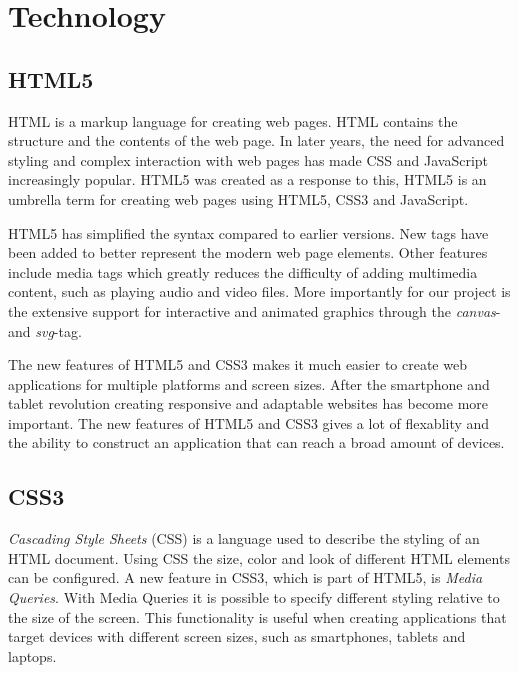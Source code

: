 \chapter{Technology} %

\label{Chapter2} %


\section{HTML5}
HTML is a markup language for creating web pages. HTML contains the structure and the contents of the web page. In later years, the need for advanced styling and complex interaction with web pages has made CSS and JavaScript increasingly popular. HTML5 was created as a response to this, HTML5 is an umbrella term for creating web pages using HTML5, CSS3 and JavaScript.

HTML5 has simplified the syntax compared to earlier versions. New tags have been added to better represent the modern web page elements. Other features include media tags which greatly reduces the difficulty of adding multimedia content, such as playing audio and video files. More importantly for our project is the extensive support for interactive and animated graphics through the \emph{canvas}- and \emph{svg}-tag.

The new features of HTML5 and CSS3 makes it much easier to create web applications for multiple platforms and screen sizes. After the smartphone and tablet revolution creating responsive and adaptable websites has become more important. %
The new features of HTML5 and CSS3 gives a lot of flexablity and the ability to construct an application that can reach a broad amount of devices.


\section{CSS3}
\emph{Cascading Style Sheets} (CSS) is a language used to describe the styling of an HTML document. Using CSS the size, color and look of different HTML elements can be configured. A new feature in CSS3, which is part of HTML5, is \emph{Media Queries}. With Media Queries it is possible to specify different styling relative to the size of the screen. This functionality is useful when creating applications that target devices with different screen sizes, such as smartphones, tablets and laptops. 

